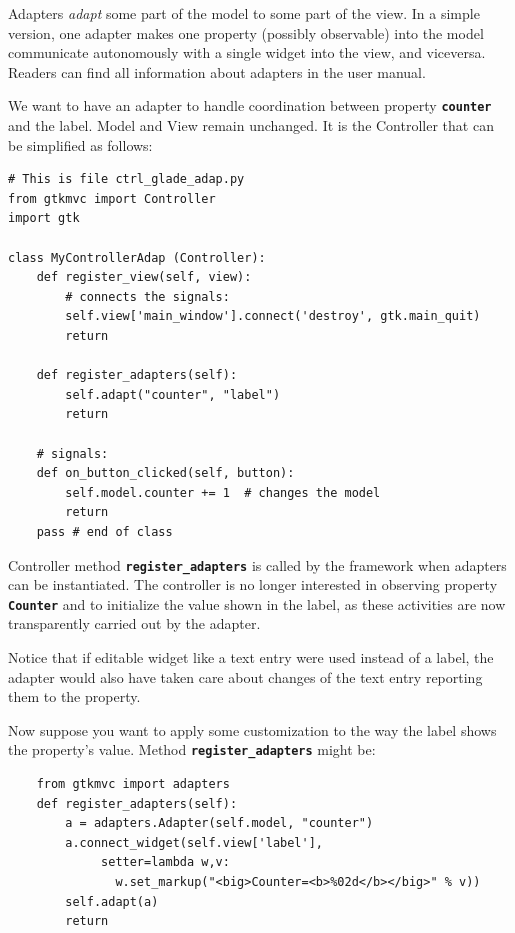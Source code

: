 \documentclass{article}
\newcommand{\codename}[1]{\texttt{\bfseries \textcolor {codecolor}{#1}}\xspace}
\newcommand{\codesize}{\small } %
\begin{document}
\smallskip
Adapters \emph{adapt} some part of the model to some part of the
view. In a simple version, one adapter makes one property (possibly
observable) into the model communicate autonomously with a single
widget into the view, and viceversa. Readers can find all
information about adapters in the user manual.

\bigskip
We want to have an adapter to handle coordination between property
\codename{counter} and the label. Model and View remain
unchanged. It is the Controller that can be simplified as follows:

{ \codesize 
\begin{verbatim}   
# This is file ctrl_glade_adap.py
from gtkmvc import Controller
import gtk

class MyControllerAdap (Controller):
    def register_view(self, view):
        # connects the signals:
        self.view['main_window'].connect('destroy', gtk.main_quit)
        return

    def register_adapters(self):
        self.adapt("counter", "label")
        return
       
    # signals:
    def on_button_clicked(self, button):
        self.model.counter += 1  # changes the model
        return    
    pass # end of class
\end{verbatim}
} 

Controller method \codename{register\_adapters} is called by the
framework when adapters can be instantiated. The controller is no
longer interested in observing property \codename{Counter} and to
initialize the value shown in the label, as these activities are now
transparently carried out by the adapter.

Notice that if editable widget like a text entry were used instead
of a label, the adapter would also have taken care about changes of
the text entry reporting them to the property. 

\bigskip
Now suppose you want to apply some customization to the way the
label shows the property's value. Method
\codename{register\_adapters} might be:

{ \codesize 
\begin{verbatim}   
    from gtkmvc import adapters
    def register_adapters(self):
        a = adapters.Adapter(self.model, "counter")
        a.connect_widget(self.view['label'], 
             setter=lambda w,v: 
               w.set_markup("<big>Counter=<b>%02d</b></big>" % v))
        self.adapt(a)
        return
\end{verbatim}
} 
\end{document}
